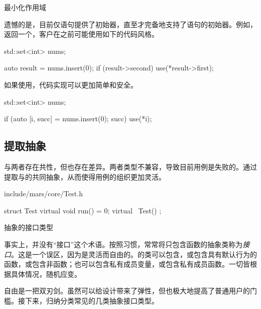 \begin{content}
\begin{episode}{最小化作用域}
\begin{content}
遗憾的是，目前仅语句提供了初始器，直至才完备地支持了语句的初始器。例如，返回一个，客户在之前可能使用如下的代码风格。

 \begin{c++}[title={\ttfamily{插入元素：C++17之前}}]
std::set<int> nums;

auto result = nums.insert(0);
if (result->second) {
  use(*result->first);
}
 \end{c++}

如果使用，代码实现可以更加简单和安全。

 \begin{c++}[title={\ttfamily{插入元素：if初始化器与结构性绑定，C++17}}]
std::set<int> nums;

if (auto [i, succ] = nums.insert(0); succ) {
  use(*i);
}
 \end{c++}

\end{content}
\end{episode}

\subsection{提取抽象}

与两者存在共性，但也存在差异。两者类型不兼容，导致目前用例是失败的。通过提取与的共同抽象，从而使得用例的组织更加灵活。

\begin{nodiff}{include/mars/core/Test.h}
 \begin{c++}
struct Test {
  virtual void run() = 0;
  virtual ~Test() {}
};
 \end{c++}
\end{nodiff}

\begin{episode}{抽象的接口类型}

\begin{content}

事实上，\cpp{}并没有“接口”这个术语。按照习惯，常常将只包含函数的抽象类称为\emph{接口}。这是一个误区，因为\cpp{}是灵活而自由的。\cpp{}的类可以包含，或包含具有默认行为的函数，或包含非函数；也可以包含私有成员变量，或包含私有成员函数。一切皆根据具体情况，随机应变。

自由是一把双刃剑。虽然可以给设计带来了弹性，但也极大地提高了普通用户的门槛。接下来，归纳分类常见的几类抽象接口类型。


\end{content}
\end{episode}
\end{content}
